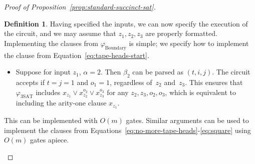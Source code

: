 \documentclass[11pt]{article}
\theoremstyle{definition}
\newtheorem{definition}[theorem]{Definition}
\begin{document}
\begin{proof}[Proof of Proposition~\ref{prop:standard-succinct-sat}]
\begin{definition}
  Having specified the inputs, we can now specify the execution of the circuit,
  and we may assume that $z_1, z_2, z_3$ are properly formatted.
  Implementing the clauses from $\varphi_{\mathrm{Boundary}}$ is simple; we
  specify how to implement the clause from Equation~\eqref{eq:tape-heads-start}.
  \begin{itemize}
  \item Suppose for input $z_1$, $\alpha = 2$.
    Then $\beta_2$ can be parsed as $(t, i, j)$.
    The circuit accepts if $t=j = 1$ and $o_1 = 1$, regardless of~$z_2$ and~$z_3$.
    This ensures that $\varphi_{\mathrm{3SAT}}$ includes $x_{z_1} \lor
    x_{z_2}^{o_2} \lor x_{z_3}^{o_3}$ for any $z_2, z_3, o_2, o_3$, which is
    equivalent to including the arity-one clause $x_{z_1}$.
  \end{itemize}
  This can be implemented with $O(m)$ gates.
  Similar arguments can be used to implement the clauses from
  Equations~\eqref{eq:no-more-tape-heads}-\eqref{eq:square} using $O(m)$ gates
  apiece.


\end{definition}
\end{proof}
\end{document}
